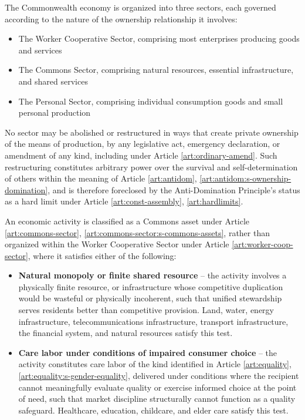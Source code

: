 


The Commonwealth economy is organized into three sectors, each governed according to the nature of the ownership relationship it involves:
\begin{itemize}
  \item The Worker Cooperative Sector, comprising most enterprises producing goods and services
  \item The Commons Sector, comprising natural resources, essential infrastructure, and shared services
  \item The Personal Sector, comprising individual consumption goods and small personal production
\end{itemize}

No sector may be abolished or restructured in ways that create private ownership of the means of production, by any legislative act, emergency declaration, or amendment of any kind, including under Article \ref{art:ordinary-amend}. Such restructuring constitutes arbitrary power over the survival and self-determination of others within the meaning of Article \ref{art:antidom}, \ref{art:antidom:s-ownership-domination}, and is therefore foreclosed by the Anti-Domination Principle's status as a hard limit under Article \ref{art:const-assembly}, \ref{art:hardlimits}.

An economic activity is classified as a Commons asset under Article \ref{art:commons-sector}, \ref{art:commons-sector:s-commons-assets}, rather than organized within the Worker Cooperative Sector under Article \ref{art:worker-coop-sector}, where it satisfies either of the following:
\begin{itemize}
  \item \textbf{Natural monopoly or finite shared resource} -- the activity involves a physically finite resource, or infrastructure whose competitive duplication would be wasteful or physically incoherent, such that unified stewardship serves residents better than competitive provision. Land, water, energy infrastructure, telecommunications infrastructure, transport infrastructure, the financial system, and natural resources satisfy this test.
  \item \textbf{Care labor under conditions of impaired consumer choice} -- the activity constitutes care labor of the kind identified in Article \ref{art:equality}, \ref{art:equality:s-gender-equality}, delivered under conditions where the recipient cannot meaningfully evaluate quality or exercise informed choice at the point of need, such that market discipline structurally cannot function as a quality safeguard. Healthcare, education, childcare, and elder care satisfy this test.
\end{itemize}

